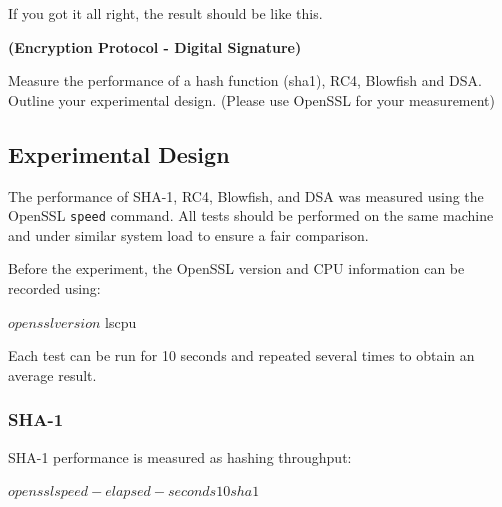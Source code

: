 \documentclass[a4paper, 10pt]{article}
\begin{document}
\begin{problem}
\par\noindent If you got it all right, the result should be like this.
\end{problem}

\begin{problem}
\textbf{(Encryption Protocol - Digital Signature)}
\begin{subproblems_alpha}
	\item Measure the performance of a hash function (sha1), RC4, Blowfish and DSA.
	      Outline your experimental design.
	      (Please use OpenSSL for your measurement)
	      \myspace[v][3][mm]
	      \begin{solution}
		      \subsection*{Experimental Design}

		      The performance of SHA-1, RC4, Blowfish, and DSA was measured using the OpenSSL \texttt{speed} command.
		      All tests should be performed on the same machine and under similar system load to ensure a fair comparison.

		      Before the experiment, the OpenSSL version and CPU information can be recorded using:

		      \begin{codingbox}[language=bash, deletekeywords={in}]
$ openssl version
$ lscpu
\end{codingbox}

		      Each test can be run for 10 seconds and repeated several times to obtain an average result.

		      \subsubsection*{SHA-1}

		      SHA-1 performance is measured as hashing throughput:

		      \begin{codingbox}[language=bash, deletekeywords={in}]
$ openssl speed -elapsed -seconds 10 sha1
$
\end{codingbox}


\end{solution}
\end{subproblems_alpha}
\end{problem}
\end{document}
